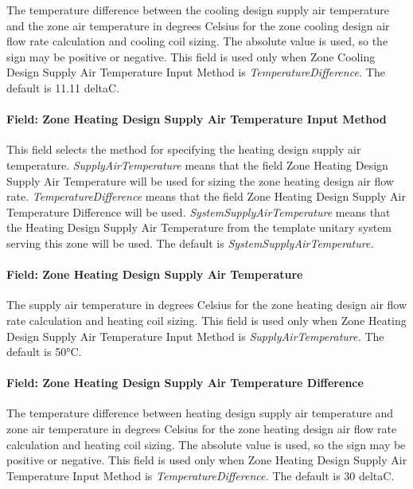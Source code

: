 The temperature difference between the cooling design supply air temperature and the zone air temperature in degrees Celsius for the zone cooling design air flow rate calculation and cooling coil sizing. The absolute value is used, so the sign may be positive or negative. This field is used only when Zone Cooling Design Supply Air Temperature Input Method is \emph{TemperatureDifference.} The default is 11.11 deltaC.

\paragraph{Field: Zone Heating Design Supply Air Temperature Input Method}\label{field-zone-heating-design-supply-air-temperature-input-method-5}

This field selects the method for specifying the heating design supply air temperature. \emph{SupplyAirTemperature} means that the field Zone Heating Design Supply Air Temperature will be used for sizing the zone heating design air flow rate. \emph{TemperatureDifference} means that the field Zone Heating Design Supply Air Temperature Difference will be used. \emph{SystemSupplyAirTemperature} means that the Heating Design Supply Air Temperature from the template unitary system serving this zone will be used. The default is \emph{SystemSupplyAirTemperature.}

\paragraph{Field: Zone Heating Design Supply Air Temperature}\label{field-zone-heating-design-supply-air-temperature-4}

The supply air temperature in degrees Celsius for the zone heating design air flow rate calculation and heating coil sizing. This field is used only when Zone Heating Design Supply Air Temperature Input Method is \emph{SupplyAirTemperature.} The default is 50°C.

\paragraph{Field: Zone Heating Design Supply Air Temperature Difference}\label{field-zone-heating-design-supply-air-temperature-difference-5}

The temperature difference between heating design supply air temperature and zone air temperature in degrees Celsius for the zone heating design air flow rate calculation and heating coil sizing. The absolute value is used, so the sign may be positive or negative. This field is used only when Zone Heating Design Supply Air Temperature Input Method is \emph{TemperatureDifference.} The default is 30 deltaC.

